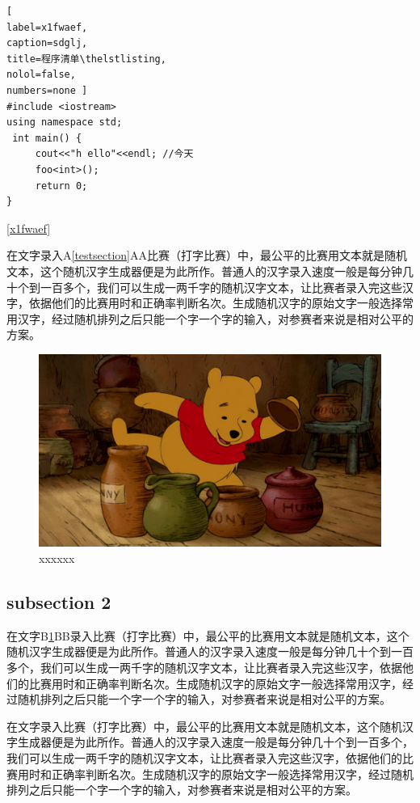 \documentclass[12pt,hyperref,UTF8]{ctexbook}
\begin{document}
\begin{lstlisting}[
label=x1fwaef,
caption=sdglj,
title=程序清单\thelstlisting,
nolol=false,
numbers=none ] 
#include <iostream> 
using namespace std;
 int main() { 
     cout<<"h ello"<<endl; //今天
     foo<int>();
     return 0;
} 
\end{lstlisting}
 

\ref{x1fwaef}

在文字录入A\ref{testsection}A\pageref{testsection}A比赛（打字比赛）中，最公平的比赛用文本就是随机文本，这个随机汉字生成器便是为此所作。普通人的汉字录入速度一般是每分钟几十个到一百多个，我们可以生成一两千字的随机汉字文本，让比赛者录入完这些汉字，依据他们的比赛用时和正确率判断名次。生成随机汉字的原始文字一般选择常用汉字，经过随机排列之后只能一个字一个字的输入，对参赛者来说是相对公平的方案。

\begin{figure}[ht]
\centering
\includegraphics[width=\textwidth]{0000.jpg}
\caption{xxxxxx}
\label{xxxxxx1}
\end{figure}

\subsection{subsection 2}

在文字B\ref{xxxxxx1}B\pageref{xxxxxx1}B录入比赛（打字比赛）中，最公平的比赛用文本就是随机文本，这个随机汉字生成器便是为此所作。普通人的汉字录入速度一般是每分钟几十个到一百多个，我们可以生成一两千字的随机汉字文本，让比赛者录入完这些汉字，依据他们的比赛用时和正确率判断名次。生成随机汉字的原始文字一般选择常用汉字，经过随机排列之后只能一个字一个字的输入，对参赛者来说是相对公平的方案。

在文字录入比赛（打字比赛）中，最公平的比赛用文本就是随机文本，这个随机汉字生成器便是为此所作。普通人的汉字录入速度一般是每分钟几十个到一百多个，我们可以生成一两千字的随机汉字文本，让比赛者录入完这些汉字，依据他们的比赛用时和正确率判断名次。生成随机汉字的原始文字一般选择常用汉字，经过随机排列之后只能一个字一个字的输入，对参赛者来说是相对公平的方案。
\end{document}
